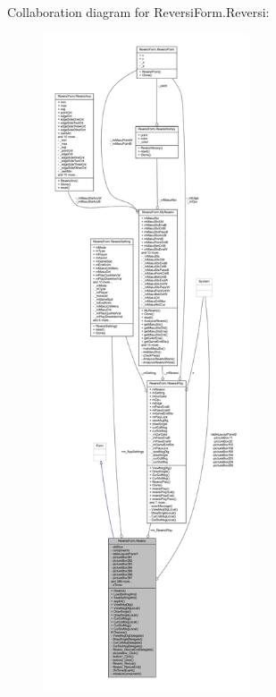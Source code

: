 Collaboration diagram for Reversi\+Form.\+Reversi\+:\nopagebreak
\begin{figure}[H]
\begin{center}
\leavevmode
\includegraphics[height=550pt]{class_reversi_form_1_1_reversi__coll__graph}
\end{center}
\end{figure}
